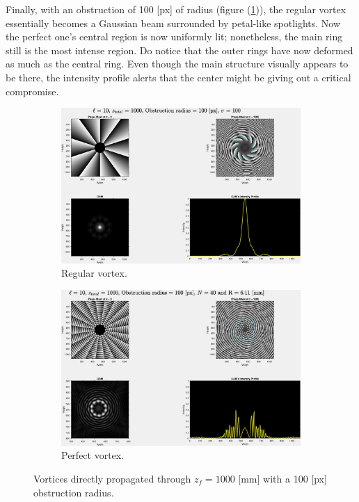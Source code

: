 Finally, with an obstruction of 100 [px] of radius (figure (\ref{fig:Vortices_r=100_z=1000})), the regular vortex essentially becomes a Gaussian beam surrounded by petal-like spotlights. Now the perfect one's central region is now uniformly lit; nonetheless, the main ring still is the most intense region. Do notice that the outer rings have now deformed as much as the central ring. Even though the main structure visually appears to be there, the intensity profile alerts that the center might be giving out a critical compromise.

\begin{figure}[htbp]
    \centering
    \begin{subfigure}[b]{0.45\textwidth}
        \centering
        \includegraphics[width=\textwidth]{images/c04/type=0_r=100_zi=0_zf=1000.eps}
        \caption{Regular vortex.}
    \end{subfigure}
    \hfill
    \begin{subfigure}[b]{0.45\textwidth}
        \centering
        \includegraphics[width=\textwidth]{images/c04/type=1_r=100_zi=0_zf=1000.eps}
        \caption{Perfect vortex.}
    \end{subfigure}
    \caption{Vortices directly propagated through $z_f = 1000$ [mm] with a 100 [px] obstruction radius.}
    \label{fig:Vortices_r=100_z=1000}
\end{figure}

